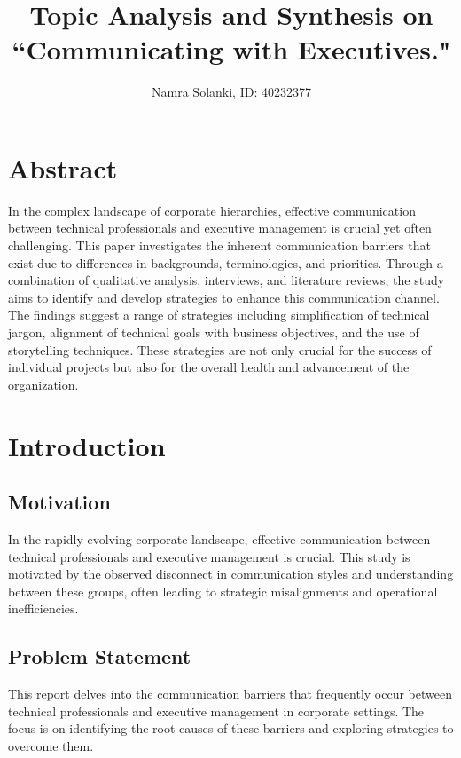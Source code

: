 \documentclass[runningheads]{llncs}
\title{Topic Analysis and Synthesis on \\ ``Communicating with Executives."}
\author{Namra Solanki, ID: 40232377}
\institute{SOEN 6841: Software Project Management \\ Concordia University, Montreal QC, Canada \\
\email{namra.solanki@mail.concordia.ca}\\ \href{https://github.com/whonamra/soen6841-topic-analysis-synthesis}{GitHub Link}}
\begin{document}
{\def\addcontentsline#1#2#3{}\maketitle}
\setcounter{tocdepth}{4}
\tableofcontents
\section{Abstract}
In the complex landscape of corporate hierarchies, effective communication between technical professionals and executive management is crucial yet often challenging. This paper investigates the inherent communication barriers that exist due to differences in backgrounds, terminologies, and priorities. Through a combination of qualitative analysis, interviews, and literature reviews, the study aims to identify and develop strategies to enhance this communication channel. The findings suggest a range of strategies including simplification of technical jargon, alignment of technical goals with business objectives, and the use of storytelling techniques. These strategies are not only crucial for the success of individual projects but also for the overall health and advancement of the organization.

\section{Introduction}
\subsection{Motivation}
In the rapidly evolving corporate landscape, effective communication between technical professionals and executive management is crucial. This study is motivated by the observed disconnect in communication styles and understanding between these groups, often leading to strategic misalignments and operational inefficiencies.

\subsection{Problem Statement}
This report delves into the communication barriers that frequently occur between technical professionals and executive management in corporate settings. The focus is on identifying the root causes of these barriers and exploring strategies to overcome them.
\end{document}
